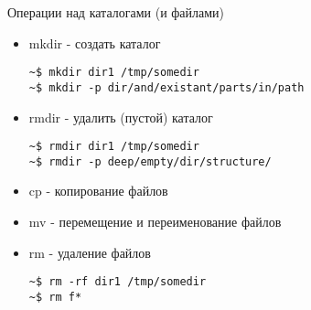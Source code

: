 \begin{frame}[fragile]{Операции над каталогами (и файлами)}
  \begin{itemize}
    \item \alert{mkdir} - создать каталог
\begin{lstlisting}[frame=single,]
~$ mkdir dir1 /tmp/somedir
~$ mkdir -p dir/and/existant/parts/in/path
\end{lstlisting} \pause
    \item \alert{rmdir} - удалить (пустой) каталог
\begin{lstlisting}[frame=single]
~$ rmdir dir1 /tmp/somedir
~$ rmdir -p deep/empty/dir/structure/
\end{lstlisting} \pause
    \item \alert{cp} - копирование файлов\footnotemark[8]
    \item \alert{mv} - перемещение и переименование файлов
    \item \alert{rm} - удаление файлов\footnotemark[17] 
\begin{lstlisting}[frame=single]
~$ rm -rf dir1 /tmp/somedir
~$ rm f*
\end{lstlisting} \pause
  \end{itemize}
\end{frame}



